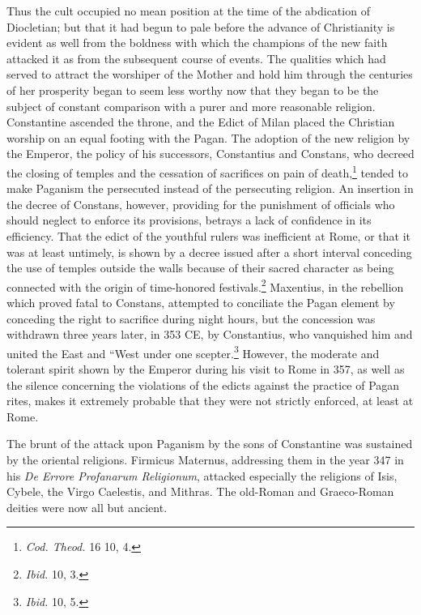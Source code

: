 \documentclass[a4paper, 11pt, oneside, polutonikogreek, english]{article}
\begin{document}
Thus the cult occupied no mean position at the time of the abdication of Diocletian; but that it had begun to pale before the advance of Christianity is evident as well from the boldness with which the champions of the new faith attacked it as from the subsequent course of events. The qualities which had served to attract the worshiper of the Mother and hold him through the centuries of her prosperity began to seem less worthy now that they began to be the subject of constant comparison with a purer and more reasonable religion. Constantine ascended the throne, and the Edict of Milan placed the Christian worship on an equal footing with the Pagan. The adoption of the new religion by the Emperor, the policy of his successors, Constantius and Constans, who decreed the closing of temples and the cessation of sacrifices on pain of death,\footnote{\emph{Cod. Theod.} 16 10, 4.} tended to make Paganism the persecuted instead of the persecuting religion. An insertion in the decree of Constans, however, providing for the punishment of officials who should neglect to enforce its provisions, betrays a lack of confidence in its efficiency. That the edict of the youthful rulers was inefficient at Rome, or that it was at least untimely, is shown by a decree issued after a short interval conceding the use of temples outside the walls because of their sacred character as being connected with the origin of time-honored festivals.\footnote{\emph{Ibid.} 10, 3.} Maxentius, in the rebellion which proved fatal to Constans, attempted to conciliate the Pagan element by conceding the right to sacrifice during night hours, but the concession was withdrawn three years later, in 353 \textsc{CE}, by Constantius, who vanquished him and united the East and ``West under one scepter.\footnote{\emph{Ibid.} 10, 5.} However, the moderate and tolerant spirit shown by the Emperor during his visit to Rome in 357, as well as the silence concerning the violations of the edicts against the practice of Pagan rites, makes it extremely probable that they were not strictly enforced, at least at Rome.

The brunt of the attack upon Paganism by the sons of Constantine was sustained by the oriental religions. Firmicus Maternus, addressing them in the year 347 in his \emph{De Errore Profanarum Religionum}, attacked especially the religions of Isis, Cybele, the Virgo Caelestis, and Mithras. The old-Roman and Graeco-Roman deities were now all but ancient.
\end{document}
